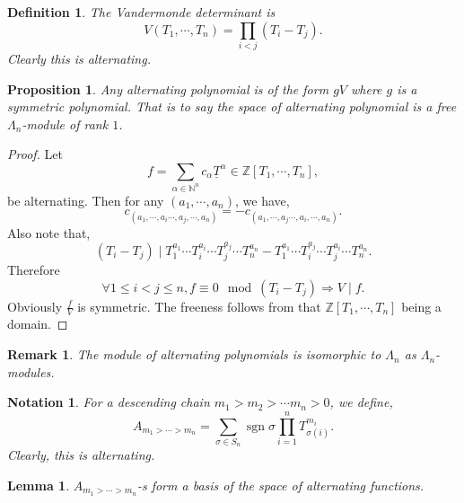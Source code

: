 \documentclass{article}
\newtheorem{proposition}{Proposition}[section]
\newtheorem{definition}{Definition}[section]
\newtheorem{lemma}{Lemma}[section]
\newtheorem{notation}{Notation}[section]
\newtheorem{remark}{Remark}[section]
\numberwithin{equation}{theorem}
\DeclareMathOperator{\sgn}{sgn}
\newcommand{\N}[0]{\mathbb{N}}
\newcommand{\Z}[0]{\mathbb{Z}}
\begin{document}
\begin{definition}
    The Vandermonde determinant is 
    \begin{equation*}
        V(T_1,\cdots,T_n) = \prod_{i<j}(T_i-T_j).
    \end{equation*}
    Clearly this is alternating. 
\end{definition}
\begin{proposition}
    \label{proposition_alternating_polynomials}
    Any alternating polynomial is of the form $gV$ where $g$ is a symmetric polynomial. That is to say the space of alternating polynomial is a free $\Lambda_n$-module of rank $1$.
\end{proposition}
\begin{proof}
Let 
\begin{equation*}
    f = \sum_{\alpha\in\N^{n}}c_\alpha \underline{T}^\alpha\in\Z[T_1,\cdots,T_n],
\end{equation*}
be alternating. Then for any $(a_1,\cdots,a_n)$, we have,
\begin{equation*}
    c_{(a_1,\cdots,a_i\cdots,a_j,\cdots,a_n)} = -c_{(a_1,\cdots,a_j\cdots,a_i,\cdots,a_n)}.
\end{equation*}
Also note that,
\begin{equation*}
    (T_i-T_j)\mid T_1^{a_1}\cdots T_i^{a_i}\cdots T_j^{a_j}\cdots T_n^{a_n} - T_1^{a_1}\cdots T_i^{a_j}\cdots T_j^{a_i}\cdots T_n^{a_n}.
\end{equation*}
Therefore 
\begin{equation*}
    \forall 1\leq i<j\leq n, f\equiv 0\mod{(T_i-T_j)}\Rightarrow V\mid f.
\end{equation*}
Obviously ${\frac f V}$ is symmetric. The freeness follows from that $\Z[T_1,\cdots,T_n]$ being a domain.
\end{proof}
\begin{remark}
    \label{remark_rank_1_module_symmetric}
    The module of alternating polynomials is isomorphic to $\Lambda_n$ as $\Lambda_n$-modules.
\end{remark}
\begin{notation}
For a descending chain $m_1>m_2>\cdots m_n>0$, we define,
\begin{equation*}
    A_{m_1>\cdots>m_n} = \sum_{\sigma\in S_n}\sgn\sigma \prod_{i=1}^nT_{\sigma(i)}^{m_i}.
\end{equation*}
Clearly, this is alternating.
\end{notation}
\begin{lemma}
    \label{lemma_alternating_polynomials_basis}
    $A_{m_1>\cdots>m_n}$-s form a basis of the space of alternating functions.
\end{lemma}
\end{document}
